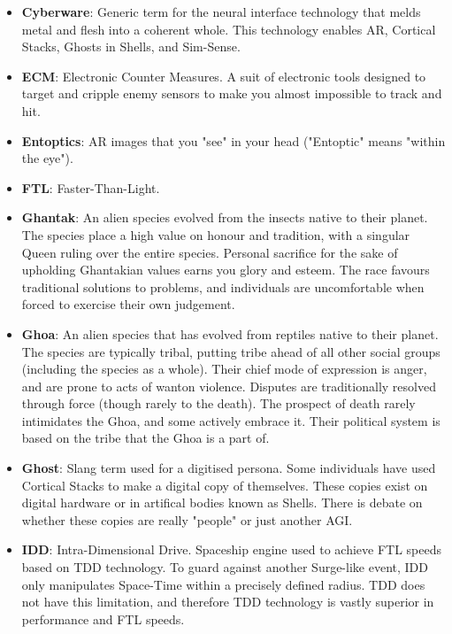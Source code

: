 \documentclass[10pt,twoside]{article}
\begin{document}
\begin{multicols}{2}
\begin{itemize}
\item \textbf{Cyberware}: Generic term for the neural interface technology that melds metal and flesh into a coherent whole. This technology enables AR, Cortical Stacks, Ghosts in Shells, and Sim-Sense.

\item \textbf{ECM}: Electronic Counter Measures. A suit of electronic tools designed to target and cripple enemy sensors to make you almost impossible to track and hit.

\item \textbf{Entoptics}: AR images that you "see" in your head ("Entoptic" means "within the eye").

\item \textbf{FTL}: Faster-Than-Light.

\item \textbf{Ghantak}: An alien species evolved from the insects native to their planet. The species place a high value on honour and tradition, with a singular Queen ruling over the entire species. Personal sacrifice for the sake of upholding Ghantakian values earns you glory and esteem. The race favours traditional solutions to problems, and individuals are uncomfortable when forced to exercise their own judgement.

\item \textbf{Ghoa}: An alien species that has evolved from reptiles native to their planet. The species are typically tribal, putting tribe ahead of all other social groups (including the species as a whole). Their chief mode of expression is anger, and are prone to acts of wanton violence. Disputes are traditionally resolved through force (though rarely to the death). The prospect of death rarely intimidates the Ghoa, and some actively embrace it. Their political system is based on the tribe that the Ghoa is a part of.

\item \textbf{Ghost}: Slang term used for a digitised persona. Some individuals have used Cortical Stacks to make a digital copy of themselves. These copies exist on digital hardware or in artifical bodies known as Shells. There is debate on whether these copies are really "people" or just another AGI.

\item \textbf{IDD}: Intra-Dimensional Drive. Spaceship engine used to achieve FTL speeds based on TDD technology. To guard against another Surge-like event, IDD only manipulates Space-Time within a precisely defined radius. TDD does not have this limitation, and therefore TDD technology is vastly superior in performance and FTL speeds.


\end{itemize}
\end{multicols}
\end{document}
